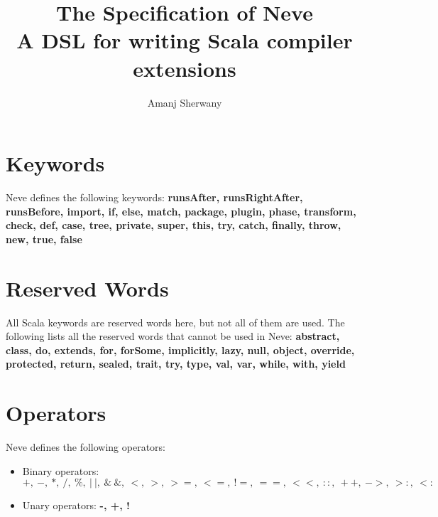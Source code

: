 \documentclass[12pt]{article}
\newcommand{\dsl}{Neve\xspace}
\begin{document}
\title{The Specification of \dsl\\
  \large{A DSL for writing Scala compiler extensions}}
\author{Amanj Sherwany}
  
  
  
\maketitle
\section{Keywords}

\raggedright
\dsl defines the following keywords: \textbf{runsAfter, runsRightAfter, runsBefore,
  import, if, else, match, package, plugin, phase, transform, check, def, case,
  tree, private, super, this, try, catch, finally, throw, new, true, false}

\section{Reserved Words}

All Scala keywords are reserved words here, but not all of them are used. The
following lists all the reserved words that cannot be used in \dsl:
\textbf{abstract, class, do, extends, for, forSome, implicitly, lazy, null,
  object, override, protected, return, sealed, trait, try, type, val, var,
  while, with, yield}


\section{Operators}
\dsl defines the following operators:

\begin{itemize}
  \item Binary operators: $+,~-,~*,~/,~\%,~|~|,~\&~\&,~
    <,~>,~>=,~<=,~!=,~==,~<<,~::,~++,~->,~>:,~<:$
  \item Unary operators: \textbf{-, +, !}
\end{itemize}
  

\newpage
\end{document}
